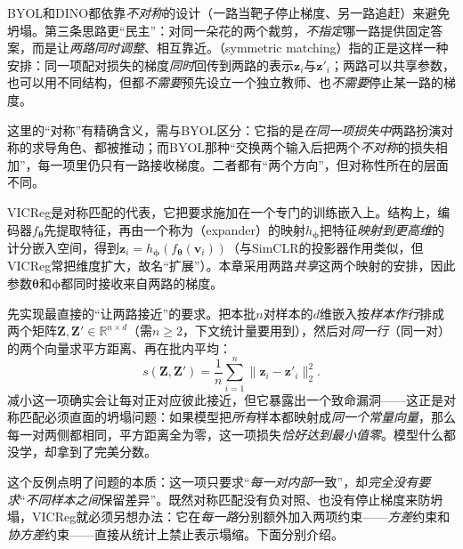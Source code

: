 BYOL和DINO都依靠\emph{不对称}的设计（一路当靶子停止梯度、另一路追赶）来避免坍塌。第三条思路更“民主”：对同一朵花的两个裁剪，\emph{不指定}哪一路提供固定答案，而是让\emph{两路同时调整}、相互靠近。（symmetric matching）指的正是这样一种安排：同一项配对损失的梯度\emph{同时}回传到两路的表示$\bm{z}_i$与$\bm{z}'_i$；两路可以共享参数，也可以用不同结构，但都\emph{不需要}预先设立一个独立教师、也\emph{不需要}停止某一路的梯度。

这里的“对称”有精确含义，需与BYOL区分：它指的是\emph{在同一项损失中}两路扮演对称的求导角色、都被推动；而BYOL那种“交换两个输入后把两个\emph{不对称}的损失相加”，每一项里仍只有一路接收梯度。二者都有“两个方向”，但对称性所在的层面不同。

VICReg是对称匹配的代表，它把要求施加在一个专门的训练嵌入上。结构上，编码器$f_{\bm{\theta}}$先提取特征，再由一个称为（expander）的映射$h_{\bm{\phi}}$把特征\emph{映射到更高维}的计分嵌入空间，得到$\bm{z}_i=h_{\bm{\phi}}(f_{\bm{\theta}}(\bm{v}_i))$（与SimCLR的投影器作用类似，但VICReg常把维度扩大，故名“扩展”）。本章采用两路\emph{共享}这两个映射的安排，因此参数$\bm{\theta}$和$\bm{\phi}$都同时接收来自两路的梯度。

先实现最直接的“让两路接近”的要求。把本批$n$对样本的$d$维嵌入按\emph{样本作行}排成两个矩阵$\bm{Z},\bm{Z}'\in\mathbb{R}^{n\times d}$（需$n\geq2$，下文统计量要用到），然后对\emph{同一行}（同一对）的两个向量求平方距离、再在批内平均：
\begin{equation}
  s(\bm{Z},\bm{Z}')
  =\frac{1}{n}\sum_{i=1}^{n}\lVert\bm{z}_i-\bm{z}'_i\rVert_2^2.
  \label{eq:data-derived-knowledge-vicreg-invariance}
\end{equation}
减小这一项确实会让每对正对应彼此接近，但它暴露出一个致命漏洞——这正是对称匹配必须直面的坍塌问题：如果模型把\emph{所有}样本都映射成\emph{同一个常量向量}，那么每一对两侧都相同，平方距离全为零，这一项损失\emph{恰好达到最小值零}。模型什么都没学，却拿到了完美分数。

这个反例点明了问题的本质：这一项只要求“\emph{每一对内部}一致”，却\emph{完全没有要求}“\emph{不同样本之间}保留差异”。既然对称匹配没有负对照、也没有停止梯度来防坍塌，VICReg就必须另想办法：它在\emph{每一路}分别额外加入两项约束——\emph{方差}约束和\emph{协方差}约束——直接从统计上禁止表示塌缩。下面分别介绍。

